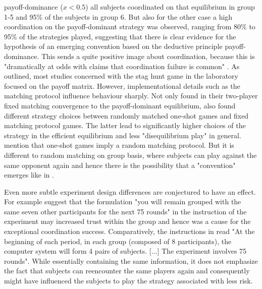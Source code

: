 \documentclass[11pt]{article}
\begin{document}
payoff-dominance ($x < 0.5$) all subjects coordinated on that equilibrium in 
group 1-5 and 95\% of the subjects in group 6. But also for the other case a 
high coordination on the payoff-dominant strategy was observed, ranging from 
80\% to 95\% of the strategies played, suggesting that there is clear evidence
for the hypothesis of an emerging convention based on the deductive principle
payoff-dominance. This sends a quite positive image about coordination, because 
this is "dramatically at odds with claims that coordination failure is common"
\parencite[9]{devetag_when_2007}. 
As outlined, most studies concerned with the stag hunt game in the 
laboratory focused on the payoff matrix. However, implementational details 
such as the matching protocol influence behaviour sharply. Not only 
\textcite{van_huyck_tacit_1990} found in their two-player fixed matching
convergence to the payoff-dominant equilibrium, 
\textcite{clark_repetition_2001} also found different strategy 
choices between randomly matched one-shot games and fixed matching protocol 
games. The latter lead to significantly higher choices of the strategy 
in the efficient equilibrium and less "disequilibrium play" in general. 
\textcite{devetag_when_2007} mention that one-shot games imply a 
random matching protocol. But it is different to random matching on group
basis, where subjects can play against the same opponent again 
and hence there is the possibility that a "convention" emerges like in 
\textcite{rankin_strategic_2000}.

Even more subtle experiment design differences are conjectured to have an
effect. For example \textcite{devetag_when_2007} suggest that the formulation
"you will remain grouped with the same seven other participants for the next
75 rounds" in the instruction of the \textcite{rankin_strategic_2000}  
experiment may increased trust within the group and hence was a 
cause for the exceptional coordination success. Comparatively, the 
instructions in \textcite{dubois_optimization_2012} read "At the beginning
of each period, in each group (composed of 8 participants), the computer
system will form 4 pairs of subjects. [...] The experiment 
involves 75 rounds"\parencite[378]{dubois_optimization_2012}. 
While essentially containing the same information,
it does not emphasize the fact that subjects can reencounter the same 
players again and consequently might have influenced the subjects to play
the strategy associated with less risk.
\end{document}
